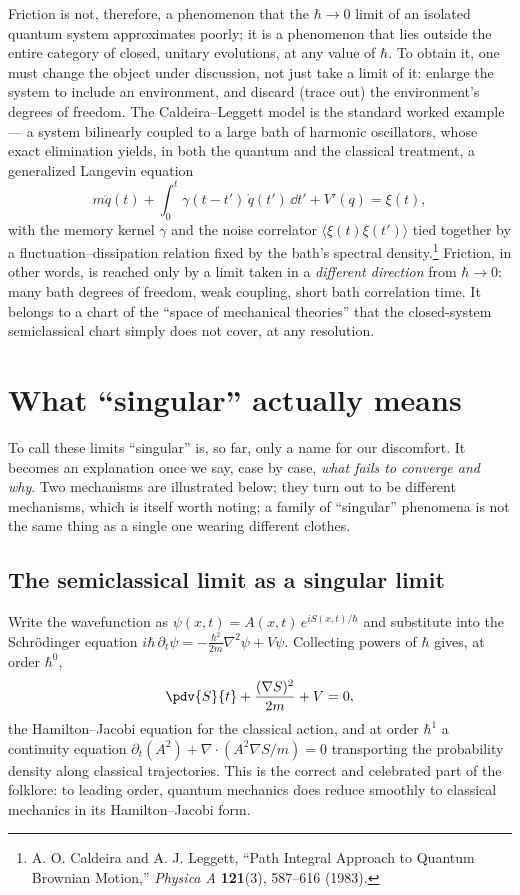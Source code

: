 Friction is not, therefore, a phenomenon that the $\hbar\to 0$ limit of an
isolated quantum system approximates poorly; it is a phenomenon that lies
outside the entire category of closed, unitary evolutions, at any value of
$\hbar$. To obtain it, one must change the object under discussion, not just
take a limit of it: enlarge the system to include an environment, and discard
(trace out) the environment's degrees of freedom. The Caldeira--Leggett model
is the standard worked example --- a system bilinearly coupled to a large bath
of harmonic oscillators, whose exact elimination yields, in both the quantum
and the classical treatment, a generalized Langevin equation
\begin{equation}
m\ddot q(t) + \int_0^t \gamma(t-t')\,\dot q(t')\,\dd t' + V'(q) = \xi(t),
\end{equation}
with the memory kernel $\gamma$ and the noise correlator $\langle
\xi(t)\xi(t')\rangle$ tied together by a fluctuation--dissipation relation
fixed by the bath's spectral density.\footnote{A. O. Caldeira and A. J.
Leggett, ``Path Integral Approach to Quantum Brownian Motion,'' \emph{Physica
A} \textbf{121}(3), 587--616 (1983).} Friction, in other words, is reached only
by a limit taken in a \emph{different direction} from $\hbar\to 0$: many bath
degrees of freedom, weak coupling, short bath correlation time. It belongs to a
chart of the ``space of mechanical theories'' that the closed-system
semiclassical chart simply does not cover, at any resolution.

\section{What ``singular'' actually means}
\label{sec:singular}

To call these limits ``singular'' is, so far, only a name for our discomfort.
It becomes an explanation once we say, case by case, \emph{what fails to
converge and why}. Two mechanisms are illustrated below; they turn out to be
different mechanisms, which is itself worth noting; a family of ``singular''
phenomena is not the same thing as a single one wearing different clothes.

\subsection{The semiclassical limit as a singular limit}
\label{sec:wkb}

Write the wavefunction as 
$\psi(x,t) = A(x,t)\,e^{iS(x,t)/\hbar}$ 
and substitute into the Schr\"odinger equation 
$i\hbar\,\partial_t\psi = -\tfrac{\hbar^2}{2m}\nabla^2\psi + V\psi$.
Collecting powers of $\hbar$ gives, at order $\hbar^0$,
\begin{equation}
\pdv{S}{t} + \frac{(\nabla S)^2}{2m} + V = 0,
\end{equation}
the Hamilton--Jacobi equation for the classical action, and at order $\hbar^1$
a continuity equation 
$\partial_t(A^2) + \nabla\!\cdot(A^2\nabla S/m) = 0$
transporting the probability density along classical trajectories. This is the
correct and celebrated part of the folklore: to leading order, quantum
mechanics does reduce smoothly to classical mechanics in its Hamilton--Jacobi
form.

